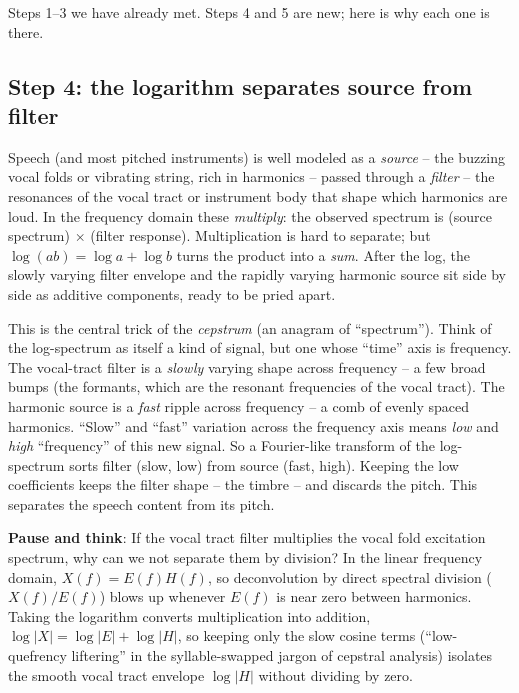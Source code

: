 Steps 1--3 we have already met. Steps 4 and 5 are new; here is why each
one is there.

\subsection*{Step 4: the logarithm separates source from filter}

Speech (and most pitched instruments) is well modeled as a \emph{source} -- the
buzzing vocal folds or vibrating string, rich in harmonics -- passed through a
\emph{filter} -- the resonances of the vocal tract or instrument body that shape
which harmonics are loud. In the frequency domain these \emph{multiply}: the
observed spectrum is (source spectrum) $\times$ (filter response). Multiplication
is hard to separate; but $\log(ab) = \log a + \log b$ turns the product into a
\emph{sum}. After the log, the slowly varying filter envelope and the rapidly
varying harmonic source sit side by side as additive components, ready to be
pried apart.

\begin{happeningbox}
This is the central trick of the \emph{cepstrum} (an anagram of ``spectrum'').
Think of the log-spectrum as itself a kind of signal, but one whose ``time'' axis
is frequency. The vocal-tract filter is a \emph{slowly} varying shape across
frequency -- a few broad bumps (the formants, which are the resonant frequencies of the vocal tract). The harmonic source is a
\emph{fast} ripple across frequency -- a comb of evenly spaced harmonics. ``Slow''
and ``fast'' variation across the frequency axis means \emph{low} and \emph{high}
``frequency'' of this new signal. So a Fourier-like transform of the log-spectrum
sorts filter (slow, low) from source (fast, high). Keeping the low coefficients
keeps the filter shape -- the timbre -- and discards the pitch. This separates the speech content from its pitch.
\end{happeningbox}

\begin{recoverybox}
\textbf{Pause and think}: If the vocal tract filter multiplies the vocal fold excitation spectrum, why can we not separate them by division? In the linear frequency domain, $X(f) = E(f) H(f)$, so deconvolution by direct spectral division ($X(f)/E(f)$) blows up whenever $E(f)$ is near zero between harmonics. Taking the logarithm converts multiplication into addition, $\log |X| = \log |E| + \log |H|$, so keeping only the slow cosine terms (``low-quefrency liftering'' in the syllable-swapped jargon of cepstral analysis) isolates the smooth vocal tract envelope $\log |H|$ without dividing by zero.
\end{recoverybox}


